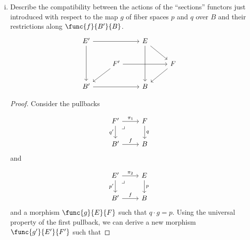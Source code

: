 \documentclass[main.tex]{subfiles}
\begin{document}
\begin{exercise}
\begin{enumerate}[(i),resume]
\begin{proof}
				For morphisms $\qty{f',g'}$  and $\qty{f,g}$ such that
				$\qty{f,g} \cdot \qty{f',g'}$ makes sense, if $s \in \Sect p$
				with $ \sm_{\qty{f,g}}\qty{s} = s'$ and $
				\sm_{\qty{f',g'}}\qty{s'} = s''$, then $s \cdot g = f \cdot
				s'$ and $s' \cdot g' = f' \cdot s''$ by the universal property
				of pullbacks $\qty{f',g'}$  and $\qty{f,g}$. We get that $s
				\cdot g \cdot g' = f \cdot s' \cdot g' = f \cdot f' \cdot s'' $.
				Since $s''$ is a section of $p''$ this allows the following
				diagram to commute:
				\[\begin{tikzcd}
					B \ar[drr, bend left, "s \cdot g \cdot g' "]
					\ar[ddr, bend right, "1_{B''}"]
					\ar[dr, dotted, "s''" description] & & \\ &
					E'' \ar[r, "f \cdot f'"] \ar[d, "p''"] \ar[dr, phantom,
					"\lrcorner", very near start] &
					E \ar[d, "p"] \\ & B'' \ar[r,"g \cdot g'"] & B
				\end{tikzcd}\]
				showing that $ s'' =
				\sm_{\qty{f',g'}}\qty{\sm_{\qty{f,g}}\qty{s}} =
				\sm_{\qty{f,g}\cdot \qty{f',g'}}\qty{s} $ for all $s \in
				\Sect p$. Thus, $\sm_{\qty{f,g}\cdot \qty{f',g'}} =
				\sm_{\qty{f',g'}} \cdot \sm_{\qty{f,g}}$. This shows that
				$\Sect$ preserves composition. Therefore, $\Sect$ is a functor.
			\end{proof}

		\item Describe the compatibility between the actions of the ``sections''
			functors just introduced with respect to the map \(g\) of fiber
			spaces \(p\) and \(q\) over \(B\) and their restrictions along
			\(\func{f}{B'}{B}\).
			\[\begin{tikzcd}
					E' \ar[rr] \ar[dd] && E \ar[dd] \ar[dr] \\ &
					F' \ar[rr] \ar[dl] && F \ar[dl] \\
					B' \ar[rr] && B
			\end{tikzcd}\]
			\begin{proof}
				Consider the pullbacks

				$$ \begin{tikzcd}
					F' \ar[r, "\pi_{1}"] \ar[d, "q'" {left}] \arrow[dr, phantom, "\lrcorner", very near start] & F \ar[d, "q"] \\
					B' \ar[r, "f"] & B
				\end{tikzcd} $$ and

				$$ \begin{tikzcd}
					E' \ar[r, "\pi_{2}"] \ar[d, "p'" {left}] \arrow[dr, phantom, "\lrcorner", very near start] & E \ar[d, "p"] \\
					B' \ar[r, "f"] & B
				\end{tikzcd} $$ and a morphism $\func{g}{E}{F}$ such that $q \cdot g = p$. Using the universal property of the first pullback, we can derive a new morphism $\func{g'}{E'}{F'}$ such that


\end{proof}
\end{enumerate}
\end{exercise}
\end{document}
